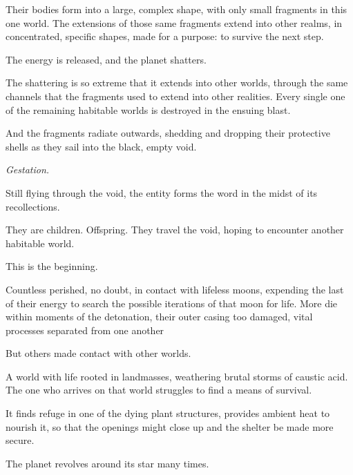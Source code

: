 Their bodies form into a large, complex shape, with only small fragments in this one world.  The extensions of those same fragments extend into other realms, in concentrated, specific shapes, made for a purpose: to survive the next step.



The energy is released, and the planet shatters.



The shattering is so extreme that it extends into other worlds, through the same channels that the fragments used to extend into other realities.  Every single one of the remaining habitable worlds is destroyed in the ensuing blast.



And the fragments radiate outwards, shedding and dropping their protective shells as they sail into the black, empty void.



\emph{Gestation.}



Still flying through the void, the entity forms the word in the midst of its recollections.



They are children.  Offspring.  They travel the void, hoping to encounter another habitable world.



This is the beginning.



Countless perished, no doubt, in contact with lifeless moons, expending the last of their energy to search the possible iterations of that moon for life.  More die within moments of the detonation, their outer casing too damaged, vital processes separated from one another



But others made contact with other worlds.



A world with life rooted in landmasses, weathering brutal storms of caustic acid.  The one who arrives on that world struggles to find a means of survival.



It finds refuge in one of the dying plant structures, provides ambient heat to nourish it, so that the openings might close up and the shelter be made more secure.



The planet revolves around its star many times.




